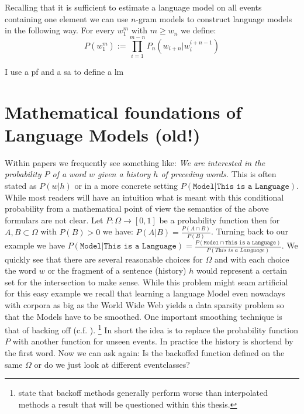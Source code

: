 \documentclass[•]{book}
\begin{document}
\begin{example}
Recalling that it is sufficient to estimate a language model on all events containing one element we can use $n$-gram models to construct language models in the following way. 
For every $w_1^m$ with $m\ge w_n$ we define:
\begin{equation}\label{eq:standardLanguageModel}
P(w_1^m):=\prod_{i=1}^{m-n}P_n(w_{i+n}|w_i^{i+n-1})
\end{equation}
\end{example}



I use a \gls{pf} and a \gls{sa} to define a \gls{lm}

\printnoidxglossaries

\chapter{Mathematical foundations of Language Models (old!)}

Within papers we frequently see something like: \textit{We are interested in the probability $P$ of a word $w$ given a history $h$ of preceding words.}
This is often stated as $P(w|h)$ or in a more concrete setting $P(\texttt{Model}|\texttt{This is a Language})$. 
While most readers will have an intuition what is meant with this conditional probability from a mathematical point of view the semantics of the above formulars are not clear.
Let $P:\Omega \rightarrow [0,1]$ be a probability function then for $A,B \subset \Omega$ with $P(B)>0$ we have: $P(A|B)=\frac{P(A\cap B)}{P(B)}$.
Turning back to our example we have $P(\texttt{Model}|\texttt{This is a Language}) = \frac{P(\texttt{Model}\cap\texttt{This is a Language})}{P(\textit{This is a Language})}$.
We quickly see that there are several reasonable choices for $\Omega$ and with each choice the word $w$ or the fragment of a sentence (history) $h$ would represent a certain set for the intersection to make sense.
While this problem might seam artificial for this easy example we recall that learning a language Model even nowadays with corpora as big as the World Wide Web yields a data sparsity problem so that the Models have to be smoothed. 
One important smoothing technique is that of backing off (c.f. \cite{katz}\cite{kneser:ney:1994}). \footnote{\cite{chen:goodman} state that backoff methods generally perform worse than interpolated methods a result that will be questioned within this thesis.}
In short the idea is to replace the probability function $P$ with another function for unseen events. 
In practice the history is shortend by the first word. 
Now we can ask again: Is the backoffed function defined on the same $\Omega$ or do we just look at different eventclasses?
\end{document}
